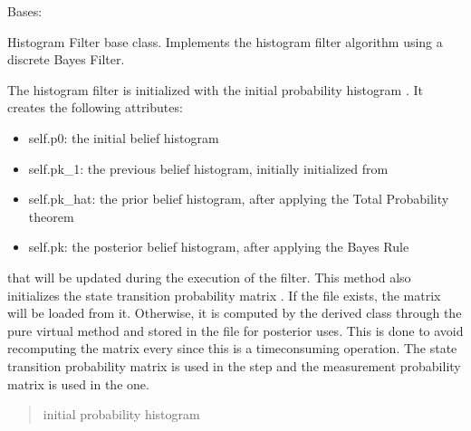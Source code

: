 \documentclass[letterpaper,10pt,english]{sphinxmanual}
\begin{document}
\begin{fulllineitems}
\label{\detokenize{HF:HF.HF}}
\pysigstartsignatures
{}
\pysigstopsignatures
\sphinxAtStartPar
Bases: 

\sphinxAtStartPar
Histogram Filter base class. Implements the histogram filter algorithm using a discrete Bayes Filter.

\begin{fulllineitems}
\label{\detokenize{HF:HF.HF.__init__}}
\pysigstartsignatures
{}
\pysigstopsignatures
\sphinxAtStartPar
The histogram filter is initialized with the initial probability histogram . It creates the following attributes:
\begin{itemize}
\item {} 
\sphinxAtStartPar
self.p0: the initial belief histogram

\item {} 
\sphinxAtStartPar
self.pk\_1: the previous belief histogram, initially initialized from 

\item {} 
\sphinxAtStartPar
self.pk\_hat: the prior belief histogram, after applying the Total Probability theorem

\item {} 
\sphinxAtStartPar
self.pk: the posterior belief histogram, after applying the Bayes Rule

\end{itemize}

\sphinxAtStartPar
that will be updated during the execution of the filter. This method also initializes the state transition
probability matrix . If the file  exists, the matrix will be loaded from it.
Otherwise, it is computed by the derived class through the pure virtual method  and stored
in the file for posterior uses. This is done to avoid recomputing the matrix every since this is a time\sphinxhyphen{}consuming operation.
The state transition probability matrix is used in the {\hyperref[\detokenize{HF:HF.HF.Prediction}]{}} step and the measurement probability
matrix is used in the {\hyperref[\detokenize{HF:HF.HF.Update}]{}} one.
\begin{quote}\begin{description}
\sphinxAtStartPar
{} \textendash{} initial probability histogram


\end{description}
\end{quote}
\end{fulllineitems}
\end{fulllineitems}
\end{document}
